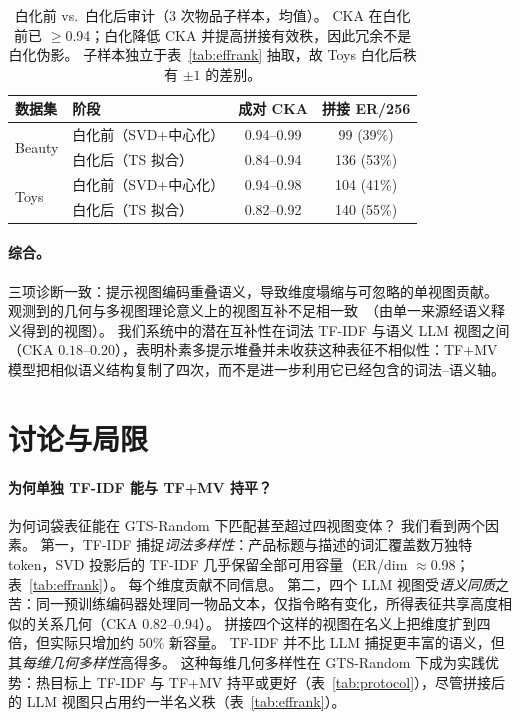 \documentclass[sigconf,natbib=true,anonymous]{acmart}
\newcommand{\tfidf}{\textsc{TF-IDF}\xspace}
\newcommand{\llm}{\textsc{LLM}\xspace}
\newcommand{\tfmv}{\textsc{TF+MV}\xspace}
\begin{document}
\begin{table}[t]
\centering
\caption{%
白化前 vs.\ 白化后审计（3 次物品子样本，均值）。
CKA 在白化前已 $\ge$0.94；白化降低 CKA 并提高拼接有效秩，因此冗余不是白化伪影。
子样本独立于表~\ref{tab:effrank} 抽取，故 Toys 白化后秩有 $\pm 1$ 的差别。%
}
\label{tab:cka-prepost}
\small
\begin{tabular}{@{}llcc@{}}
\toprule
数据集 & 阶段 & 成对 CKA & 拼接 ER/256 \\
\midrule
\multirow{2}{*}{Beauty}
 & 白化前（SVD+中心化）  & 0.94--0.99 & 99 (39\%) \\
 & 白化后（TS 拟合）     & 0.84--0.94 & 136 (53\%) \\
\midrule
\multirow{2}{*}{Toys}
 & 白化前（SVD+中心化）  & 0.94--0.98 & 104 (41\%) \\
 & 白化后（TS 拟合）     & 0.82--0.92 & 140 (55\%) \\
\bottomrule
\end{tabular}
\end{table}

\paragraph{综合。}
三项诊断一致：提示视图编码重叠语义，导致维度塌缩与可忽略的单视图贡献。
观测到的几何与多视图理论意义上的视图互补不足相一致~\cite{xu2013multiview}（由单一来源经语义释义得到的视图）。
我们系统中的潜在互补性在词法 \tfidf 与语义 \llm 视图之间（CKA $0.18$--$0.20$），表明朴素多提示堆叠并未收获这种表征不相似性：\tfmv 模型把相似语义结构复制了四次，而不是进一步利用它已经包含的词法--语义轴。

\section{讨论与局限}
\label{sec:discussion}

\paragraph{为何单独 TF-IDF 能与 \tfmv 持平？}
为何词袋表征能在 GTS-Random 下匹配甚至超过四视图变体？
我们看到两个因素。
第一，\tfidf 捕捉\emph{词法多样性}：产品标题与描述的词汇覆盖数万独特 token，SVD 投影后的 TF-IDF 几乎保留全部可用容量（ER/dim $\approx$0.98；表~\ref{tab:effrank}）。
每个维度贡献不同信息。
第二，四个 LLM 视图受\emph{语义同质}之苦：同一预训练编码器处理同一物品文本，仅指令略有变化，所得表征共享高度相似的关系几何（CKA 0.82--0.94）。
拼接四个这样的视图在名义上把维度扩到四倍，但实际只增加约 $50\%$ 新容量。
TF-IDF 并不比 LLM 捕捉更丰富的语义，但其\emph{每维几何多样性}高得多。
这种每维几何多样性在 GTS-Random 下成为实践优势：热目标上 \tfidf 与 \tfmv 持平或更好（表~\ref{tab:protocol}），尽管拼接后的 LLM 视图只占用约一半名义秩（表~\ref{tab:effrank}）。
\end{document}
